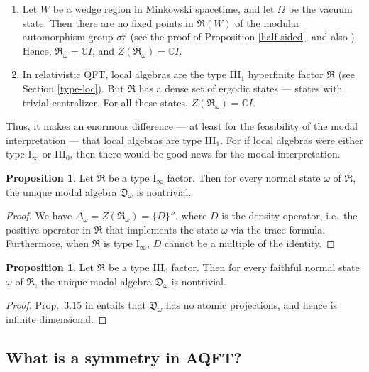 \documentclass[11pt]{article}
\theoremstyle{definition}
\newtheorem{prop}[thm]{Proposition}
\theoremstyle{definition}
\theoremstyle{remark}
\def\7#1{{\mathbb #1}}
\def\al#1{{\mathfrak #1}}
\def\om{\omega} \def\Om{\Omega} \def\dd{\partial} \def\D{\Delta}
\begin{document}
\begin{enumerate}
\item Let $W$ be a wedge region in Minkowski spacetime, and let $\Om$
  be the vacuum state.  Then there are no fixed points in $\al R(W)$
  of the modular automorphism group $\sigma ^\om _t$ (see the proof of
  Proposition \ref{half-sided}, and also \cite{wulf}). Hence, $\al
  R_\om =\7C I$, and $Z (\al R_\om )=\7C I$.
\item In relativistic QFT, local algebras are the type III$_1$
  hyperfinite factor $\al R$ (see Section \ref{type-loc}).  But $\al
  R$ has a dense set of ergodic states --- states with trivial
  centralizer.  For all these states, $Z(\al R_\om)=\7C I$.
\end{enumerate}

Thus, it makes an enormous difference --- at least for the feasibility
of the modal interpretation --- that local algebras are type III$_1$.
For if local algebras were either type I$_{\infty}$ or III$_0$, then
there would be good news for the modal interpretation.

\begin{prop} Let $\al R$ be a type I$_\infty$ factor.  Then for every
  normal state $\om$ of $\al R$, the unique modal algebra $\al D_\om$
  is nontrivial.  \end{prop}

\begin{proof} We have $\D _\om = Z(\al R_\om )=\{ D\}''$, where $D$ is
  the density operator, i.e.\ the positive operator in $\al R$ that
  implements the state $\om$ via the trace formula.  Furthermore, when
  $\al R$ is type I$_\infty$, $D$ cannot be a multiple of the
  identity.
\end{proof}

\begin{prop} Let $\al R$ be a type III$_0$ factor.  Then for every
  faithful normal state $\om$ of $\al R$, the unique modal algebra
  $\al D_\om$ is nontrivial.
\end{prop}

\begin{proof} Prop.\ 3.15 in \cite[p.\ 402]{tak2} entails that $\al
  D_\om$ has no atomic projections, and hence is infinite dimensional.
\end{proof}




\subsection{What is a symmetry in AQFT?}
\end{document}
